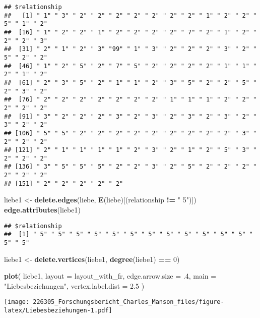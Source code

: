 \documentclass[
]{article}
\newenvironment{Shaded}{\begin{snugshade}}{\end{snugshade}}
\newcommand{\DataTypeTok}[1]{\textcolor[rgb]{0.13,0.29,0.53}{#1}}
\newcommand{\DecValTok}[1]{\textcolor[rgb]{0.00,0.00,0.81}{#1}}
\newcommand{\FloatTok}[1]{\textcolor[rgb]{0.00,0.00,0.81}{#1}}
\newcommand{\KeywordTok}[1]{\textcolor[rgb]{0.13,0.29,0.53}{\textbf{#1}}}
\newcommand{\NormalTok}[1]{#1}
\newcommand{\OperatorTok}[1]{\textcolor[rgb]{0.81,0.36,0.00}{\textbf{#1}}}
\newcommand{\StringTok}[1]{\textcolor[rgb]{0.31,0.60,0.02}{#1}}
\begin{document}
\begin{verbatim}
## $relationship
##   [1] " 1" " 3" " 2" " 2" " 2" " 2" " 2" " 2" " 2" " 1" " 2" " 2" " 5" " 1" " 2"
##  [16] " 1" " 2" " 2" " 1" " 2" " 2" " 2" " 2" " 7" " 2" " 1" " 2" " 2" " 2" " 3"
##  [31] " 2" " 1" " 2" " 3" "99" " 1" " 3" " 2" " 2" " 2" " 3" " 2" " 5" " 2" " 2"
##  [46] " 1" " 2" " 5" " 2" " 7" " 5" " 2" " 2" " 2" " 2" " 1" " 1" " 2" " 1" " 2"
##  [61] " 2" " 3" " 5" " 2" " 1" " 1" " 2" " 3" " 5" " 2" " 2" " 5" " 2" " 3" " 2"
##  [76] " 2" " 2" " 2" " 2" " 2" " 2" " 2" " 1" " 1" " 1" " 2" " 2" " 2" " 2" " 2"
##  [91] " 3" " 2" " 2" " 2" " 3" " 2" " 3" " 2" " 3" " 2" " 3" " 2" " 3" " 2" " 2"
## [106] " 5" " 5" " 2" " 2" " 2" " 2" " 2" " 2" " 2" " 2" " 2" " 3" " 2" " 2" " 2"
## [121] " 2" " 1" " 1" " 1" " 1" " 2" " 3" " 2" " 1" " 2" " 5" " 3" " 2" " 2" " 2"
## [136] " 3" " 5" " 5" " 5" " 2" " 2" " 3" " 2" " 5" " 2" " 2" " 2" " 2" " 2" " 2"
## [151] " 2" " 2" " 2" " 2" " 2"
\end{verbatim}

\begin{Shaded}
\begin{Highlighting}[]
\NormalTok{liebe1 <-}\StringTok{ }\KeywordTok{delete.edges}\NormalTok{(liebe, }\KeywordTok{E}\NormalTok{(liebe)[(relationship }\OperatorTok{!=}\StringTok{ " 5"}\NormalTok{)])}
\KeywordTok{edge.attributes}\NormalTok{(liebe1)}
\end{Highlighting}
\end{Shaded}

\begin{verbatim}
## $relationship
##  [1] " 5" " 5" " 5" " 5" " 5" " 5" " 5" " 5" " 5" " 5" " 5" " 5" " 5" " 5"
\end{verbatim}

\begin{Shaded}
\begin{Highlighting}[]
\NormalTok{liebe1 <-}\StringTok{ }\KeywordTok{delete.vertices}\NormalTok{(liebe1, }\KeywordTok{degree}\NormalTok{(liebe1) }\OperatorTok{==}\StringTok{ }\DecValTok{0}\NormalTok{)}

\KeywordTok{plot}\NormalTok{(}
\NormalTok{  liebe1,}
  \DataTypeTok{layout =}\NormalTok{ layout_with_fr,}
  \DataTypeTok{edge.arrow.size =} \FloatTok{.4}\NormalTok{,}
  \DataTypeTok{main =} \StringTok{"Liebesbeziehungen"}\NormalTok{,}
  \DataTypeTok{vertex.label.dist =} \FloatTok{2.5}
\NormalTok{)}
\end{Highlighting}
\end{Shaded}

\texttt{[image: 226305\_Forschungsbericht\_Charles\_Manson\_files/figure-latex/Liebesbeziehungen-1.pdf]}
\end{document}
